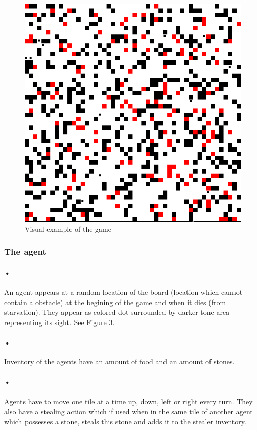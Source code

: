 \documentclass{article}
\begin{document}
\begin{figure}
\centering
\includegraphics[scale=0.2]{game.png}
\caption{Visual example of the game}
\end{figure}

\subsubsection{The agent}

\paragraph{•}
An agent appears at a random location of the board (location which cannot contain a obstacle) at the begining of the game and when it dies (from starvation). They appear as colored dot surrounded by darker tone area representing its sight. See Figure 3.\par

\paragraph{•}
Inventory of the agents have an amount of food and an amount of stones.

\paragraph{•}
Agents have to move one tile at a time up, down, left or right every turn. They also have a stealing action which if used when in the same tile of another agent which possesses a stone, steals this stone and adds it to the stealer inventory.
\end{document}
